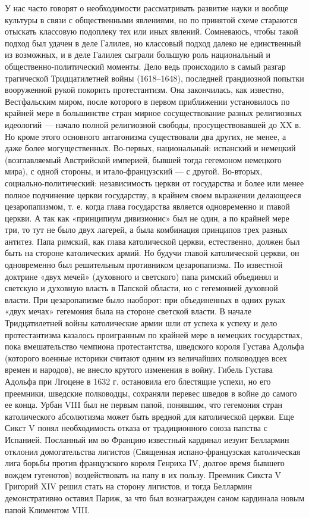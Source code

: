 У нас  часто говорят  о необходимости  рассматривать развитие  науки и
вообще  культуры в  связи с  общественными явлениями,  но по  принятой
схеме  стараются отыскать  классовую подоплеку  тех или  иных явлений.
Сомневаюсь, чтобы такой подход был удачен в деле Галилея, но классовый
подход далеко не  единственный из возможных, и в  деле Галилея сыграли
большую  роль национальный  и  общественно-политический моменты.  Дело
ведь  происходило  в  самый разгар  трагической  Тридцатилетней  войны
(1618--1648), последней грандиозной попытки вооруженной рукой покорить
протестантизм.  Она  закончилась,  как известно,  Вестфальским  миром,
после которого  в первом  приближении установилось  по крайней  мере в
большинстве стран мирное  сосуществование разных религиозных идеологий
---  начало  полной  религиозной   свободы,  просуществовавшей  до  XX
в.  Но  кроме этого  основного  антагонизма  существовали два  других,
не  менее,  а  даже  более  могущественных.  Во-первых,  национальный:
испанский и немецкий (возглавляемый Австрийской империей, бывшей тогда
гегемоном немецкого мира), с одной  стороны, и итало-французский --- с
другой.  Во-вторых,  социально-политический: независимость  церкви  от
государства и  более или  менее полное подчинение  церкви государству,
в  крайнем  своем выражении  делающееся  цезаропапизмом,  т. е.  когда
глава государства  является одновременно  и главой  церкви. А  так как
«принципиум дивизионис» был не один, а  по крайней мере три, то тут не
было двух  лагерей, а была  комбинация принципов трех  разных антитез.
Папа римский,  как глава католической церкви,  естественно, должен был
быть  на стороне  католических  армий. Но  будучи главой  католической
церкви, он одновременно был  решительным противником цезаропапизма. По
известной доктрине  «двух мечей» (духовного и  светского) папа римский
объединял  и  светскую и  духовную  власть  в  Папской области,  но  с
гегемонией  духовной  власти.  При цезаропапизме  было  наоборот:  при
объединенных  в одних  руках «двух  мечах» гегемония  была на  стороне
светской власти. В начале  Тридцатилетней войны католические армии шли
от  успеха к  успеху  и дело  протестантизма  казалось проигранным  по
крайней  мере в  немецких  государствах,  пока вмешательство  чемпиона
протестантства,  шведского короля  Густава  Адольфа (которого  военные
историки  считают  одним  из  величайших  полководцев  всех  времен  и
народов),  не  внесло  крутого   изменения  в  войну.  Гибель  Густава
Адольфа  при  Лгоцене  в  1632 г.  остановила  его  блестящие  успехи,
но  его  преемники,  шведские  полководцы,  сохраняли  перевес  шведов
в  войне  до  самого  ее  конца.  Урбан  VIII  был  не  первым  папой,
понявшим,  что гегемония  стран католического  абсолютизма может  быть
вредной  для  католической церкви.  Еще  Сикст  V понял  необходимость
отказа  от традиционного  союза папства  с Испанией.  Посланный им  во
Францию  известный кардинал  иезуит Беллармин  отклонил домогательства
лигистов (Священная испано-французская католическая лига борьбы против
французского короля Генриха IV, долгое время бывшего вождем гугенотов)
воздействовать на  папу в  их пользу. Преемник  Сикста V  Григорий XIV
решил  стать на  сторону  лигистов, и  тогда Беллармин  демонстративно
оставил Париж,  за что  был вознагражден  саном кардинала  новым папой
Климентом VIII.

